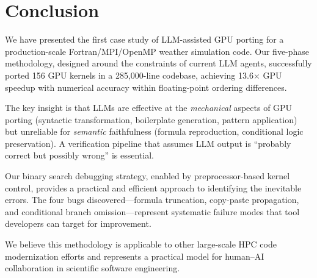 \documentclass[conference]{IEEEtran}
\begin{document}
\section{Conclusion}
\label{sec:conclusion}

We have presented the first case study of LLM-assisted GPU porting for a
production-scale Fortran/MPI/OpenMP weather simulation code. Our five-phase
methodology, designed around the constraints of current LLM agents,
successfully ported 156 GPU kernels in a 285,000-line codebase, achieving
13.6$\times$ GPU speedup with numerical accuracy within floating-point
ordering differences.

The key insight is that LLMs are effective at the \emph{mechanical} aspects
of GPU porting (syntactic transformation, boilerplate generation, pattern
application) but unreliable for \emph{semantic} faithfulness (formula
reproduction, conditional logic preservation). A verification pipeline that
assumes LLM output is ``probably correct but possibly wrong'' is essential.

Our binary search debugging strategy, enabled by preprocessor-based kernel
control, provides a practical and efficient approach to identifying the
inevitable errors. The four bugs discovered---formula truncation, copy-paste
propagation, and conditional branch omission---represent systematic failure
modes that tool developers can target for improvement.

We believe this methodology is applicable to other large-scale HPC code
modernization efforts and represents a practical model for human--AI
collaboration in scientific software engineering.
\end{document}
